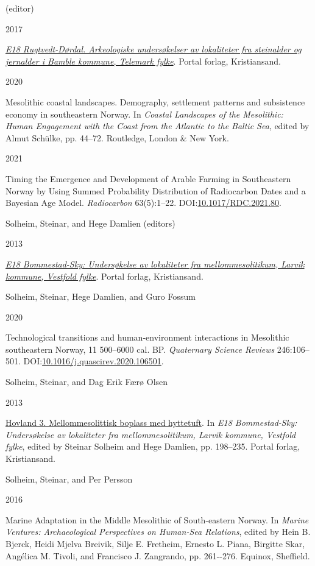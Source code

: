 \documentclass[
  12pt,
  a4paper,
  oneside]{book}
\newlength{\cslhangindent}
\newlength{\csllabelwidth}
\newlength{\cslentryspacingunit} %
\newenvironment{CSLReferences}[2] %
 {%
  \setlength{\parindent}{0pt}
  \ifodd #1
  \let\oldpar\par
  \def\par{\hangindent=\cslhangindent\oldpar}
  \fi
  \setlength{\parskip}{#2\cslentryspacingunit}
 }%
 {}
\newcommand{\CSLBlock}[1]{#1\hfill\break}
\newcommand{\CSLLeftMargin}[1]{\parbox[t]{\csllabelwidth}{#1}}
\newcommand{\CSLRightInline}[1]{\parbox[t]{\linewidth - \csllabelwidth}{#1}\break}
\begin{document}
\begin{CSLReferences}{0}{0}
\leavevmode{}%
\CSLBlock{ (editor)}
\CSLLeftMargin{ 2017}
\CSLRightInline{\emph{\href{https://doi.org/10.23865/noasp.58}{{E18 Rugtvedt-Dørdal. Arkeologiske undersøkelser av lokaliteter fra steinalder og jernalder i Bamble kommune, Telemark fylke}}}. Portal forlag, Kristiansand.}

\leavevmode{}%
\CSLLeftMargin{ 2020 }
\CSLRightInline{{Mesolithic coastal landscapes. Demography, settlement patterns and subsistence economy in southeastern Norway}. In \emph{{Coastal Landscapes of the Mesolithic: Human Engagement with the Coast from the Atlantic to the Baltic Sea}}, edited by Almut Schülke, pp. 44--72. Routledge, London \& New York.}

\leavevmode{}%
\CSLLeftMargin{ 2021 }
\CSLRightInline{Timing the Emergence and Development of Arable Farming in Southeastern Norway by Using Summed Probability Distribution of Radiocarbon Dates and a Bayesian Age Model. \emph{Radiocarbon} 63(5):1--22. DOI:\href{https://doi.org/10.1017/RDC.2021.80}{10.1017/RDC.2021.80}.}

\leavevmode{}%
\CSLBlock{Solheim, Steinar, and Hege Damlien (editors)}
\CSLLeftMargin{ 2013}
\CSLRightInline{\emph{\href{https://doi.org/10.23865/noasp.53}{{E18 Bommestad-Sky: Undersøkelse av lokaliteter fra mellommesolitikum, Larvik kommune, Vestfold fylke}}}. Portal forlag, Kristiansand.}

\leavevmode{}%
\CSLBlock{Solheim, Steinar, Hege Damlien, and Guro Fossum}
\CSLLeftMargin{ 2020}
\CSLRightInline{Technological transitions and human-environment interactions in Mesolithic southeastern Norway, 11 500--6000 cal. BP. \emph{Quaternary Science Reviews} 246:106--501. DOI:\href{https://doi.org/10.1016/j.quascirev.2020.106501}{10.1016/j.quascirev.2020.106501}.}

\leavevmode{}%
\CSLBlock{Solheim, Steinar, and Dag Erik Færø Olsen}
\CSLLeftMargin{ 2013}
\CSLRightInline{\href{https://doi.org/10.23865/noasp.53}{{Hovland 3. Mellommesolittisk boplass med hyttetuft}}. In \emph{{E18 Bommestad-Sky: Undersøkelse av lokaliteter fra mellommesolitikum, Larvik kommune, Vestfold fylke}}, edited by Steinar Solheim and Hege Damlien, pp. 198--235. Portal forlag, Kristiansand.}

\leavevmode{}%
\CSLBlock{Solheim, Steinar, and Per Persson}
\CSLLeftMargin{ 2016}
\CSLRightInline{{Marine Adaptation in the Middle Mesolithic of South-eastern Norway}. In \emph{{Marine Ventures: Archaeological Perspectives on Human-Sea Relations}}, edited by Hein B. Bjerck, Heidi Mjelva Breivik, Silje E. Fretheim, Ernesto L. Piana, Birgitte Skar, Angélica M. Tivoli, and Francisco J. Zangrando, pp. 261-\/-276. Equinox, Sheffield.}


\end{CSLReferences}
\end{document}
